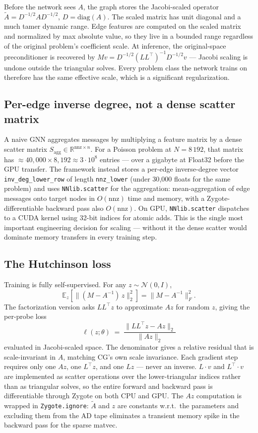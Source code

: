 \documentclass[11pt]{article}
\newcommand{\code}[1]{\texttt{\small #1}}
\begin{document}
Before the network sees $A$, the graph stores the Jacobi-scaled operator $\tilde A = D^{-1/2} A D^{-1/2}$, $D = \mathrm{diag}(A)$. The scaled matrix has unit diagonal and a much tamer dynamic range. Edge features are computed on the scaled matrix and normalized by max absolute value, so they live in a bounded range regardless of the original problem's coefficient scale. At inference, the original-space preconditioner is recovered by $M v = D^{-1/2} (LL^\top)^{-1} D^{-1/2} v$ --- Jacobi scaling is undone outside the triangular solves. Every problem class the network trains on therefore has the same effective scale, which is a significant regularization.

\subsection{Per-edge inverse degree, not a dense scatter matrix}

A naive GNN aggregates messages by multiplying a feature matrix by a dense scatter matrix $S_{\text{agg}} \in \mathbb{R}^{\text{nnz}\times n}$. For a Poisson problem at $N{=}8\,192$, that matrix has $\approx 40{,}000 \times 8{,}192 \approx 3\cdot 10^8$ entries --- over a gigabyte at Float32 before the GPU transfer. The framework instead stores a per-edge inverse-degree vector \code{inv\_deg\_lower\_row} of length \code{nnz\_lower} (under 30{,}000 floats for the same problem) and uses \code{NNlib.scatter} for the aggregation: mean-aggregation of edge messages onto target nodes in $O(\text{nnz})$ time and memory, with a Zygote-differentiable backward pass also $O(\text{nnz})$. On GPU, \code{NNlib.scatter} dispatches to a CUDA kernel using 32-bit indices for atomic adds. This is the single most important engineering decision for scaling --- without it the dense scatter would dominate memory transfers in every training step.

\subsection{The Hutchinson loss}

Training is fully self-supervised. For any $z \sim \mathcal N(0, I)$,
\[
\mathbb E_z\!\left[\| (M - A^{-1})\,z \|_2^2\right] = \| M - A^{-1} \|_F^2.
\]
The factorization version asks $LL^\top z$ to approximate $Az$ for random $z$, giving the per-probe loss
\[
\ell(z;\theta) \;=\; \frac{\| LL^\top z - A z\|_2}{\| A z\|_2}
\]
evaluated in Jacobi-scaled space. The denominator gives a relative residual that is scale-invariant in $A$, matching CG's own scale invariance. Each gradient step requires only one $Az$, one $L^\top z$, and one $Lz$ --- never an inverse. $L\cdot v$ and $L^\top\cdot v$ are implemented as scatter operations over the lower-triangular indices rather than as triangular solves, so the entire forward and backward pass is differentiable through Zygote on both CPU and GPU. The $Az$ computation is wrapped in \code{Zygote.ignore}: $\tilde A$ and $z$ are constants w.r.t.\ the parameters and excluding them from the AD tape eliminates a transient memory spike in the backward pass for the sparse matvec.
\end{document}
